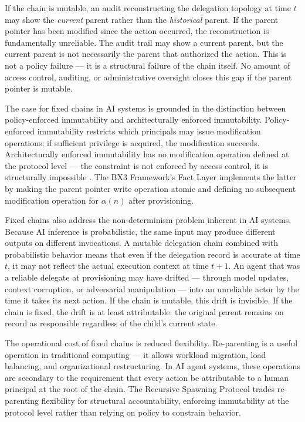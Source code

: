 If the chain is mutable, an audit reconstructing the delegation topology at time $t$ may show the \emph{current} parent rather than the \emph{historical} parent. If the parent pointer has been modified since the action occurred, the reconstruction is fundamentally unreliable. The audit trail may show a current parent, but the current parent is not necessarily the parent that authorized the action. This is not a policy failure — it is a structural failure of the chain itself. No amount of access control, auditing, or administrative oversight closes this gap if the parent pointer is mutable.

The case for fixed chains in AI systems is grounded in the distinction between policy-enforced immutability and architecturally enforced immutability. Policy-enforced immutability restricts which principals may issue modification operations; if sufficient privilege is acquired, the modification succeeds. Architecturally enforced immutability has no modification operation defined at the protocol level — the constraint is not enforced by access control, it is structurally impossible \cite{bx3whitepaper2026}. The BX3 Framework's Fact Layer implements the latter by making the parent pointer write operation atomic and defining no subsequent modification operation for $\alpha(n)$ after provisioning.

Fixed chains also address the non-determinism problem inherent in AI systems. Because AI inference is probabilistic, the same input may produce different outputs on different invocations. A mutable delegation chain combined with probabilistic behavior means that even if the delegation record is accurate at time $t$, it may not reflect the actual execution context at time $t+1$. An agent that was a reliable delegate at provisioning may have drifted — through model updates, context corruption, or adversarial manipulation — into an unreliable actor by the time it takes its next action. If the chain is mutable, this drift is invisible. If the chain is fixed, the drift is at least attributable: the original parent remains on record as responsible regardless of the child's current state.

The operational cost of fixed chains is reduced flexibility. Re-parenting is a useful operation in traditional computing — it allows workload migration, load balancing, and organizational restructuring. In AI agent systems, these operations are secondary to the requirement that every action be attributable to a human principal at the root of the chain. The Recursive Spawning Protocol trades re-parenting flexibility for structural accountability, enforcing immutability at the protocol level rather than relying on policy to constrain behavior.

